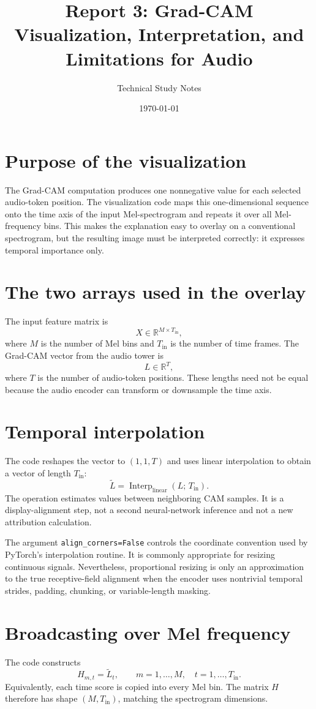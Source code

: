 \documentclass[11pt,a4paper]{article}
\title{Report 3: Grad-CAM Visualization, Interpretation, and Limitations for Audio}
\author{Technical Study Notes}
\date{\today}
\begin{document}
\maketitle
\tableofcontents
\newpage
\section{Purpose of the visualization}
The Grad-CAM computation produces one nonnegative value for each selected audio-token position. The visualization code maps this one-dimensional sequence onto the time axis of the input Mel-spectrogram and repeats it over all Mel-frequency bins. This makes the explanation easy to overlay on a conventional spectrogram, but the resulting image must be interpreted correctly: it expresses temporal importance only.

\section{The two arrays used in the overlay}
The input feature matrix is
\[
X\in\mathbb{R}^{M\times T_{\mathrm{in}}},
\]
where $M$ is the number of Mel bins and $T_{\mathrm{in}}$ is the number of time frames. The Grad-CAM vector from the audio tower is
\[
L\in\mathbb{R}^{T},
\]
where $T$ is the number of audio-token positions. These lengths need not be equal because the audio encoder can transform or downsample the time axis.

\section{Temporal interpolation}
The code reshapes the vector to $(1,1,T)$ and uses linear interpolation to obtain a vector of length $T_{\mathrm{in}}$:
\[
\widetilde{L}=\operatorname{Interp}_{\mathrm{linear}}
(L;\,T_{\mathrm{in}}).
\]
The operation estimates values between neighboring CAM samples. It is a display-alignment step, not a second neural-network inference and not a new attribution calculation.

The argument \texttt{align\_corners=False} controls the coordinate convention used by PyTorch's interpolation routine. It is commonly appropriate for resizing continuous signals. Nevertheless, proportional resizing is only an approximation to the true receptive-field alignment when the encoder uses nontrivial temporal strides, padding, chunking, or variable-length masking.

\section{Broadcasting over Mel frequency}
The code constructs
\[
H_{m,t}=\widetilde{L}_t,
\qquad
m=1,\ldots,M,\quad t=1,\ldots,T_{\mathrm{in}}.
\]
Equivalently, each time score is copied into every Mel bin. The matrix $H$ therefore has shape $(M,T_{\mathrm{in}})$, matching the spectrogram dimensions.
\end{document}
